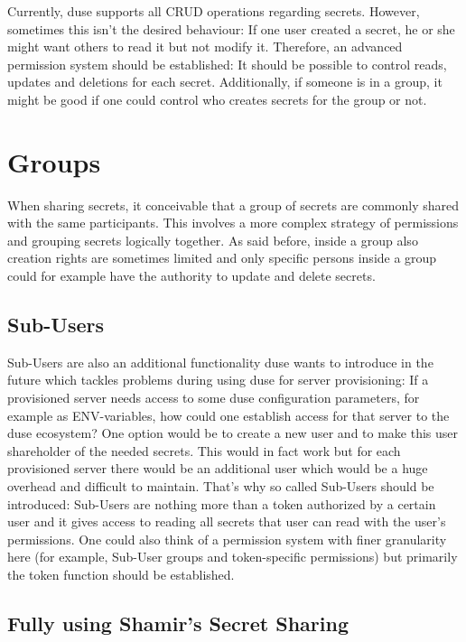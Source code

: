 Currently, duse supports all CRUD operations regarding secrets. However,
sometimes this isn't the desired behaviour: If one user created a secret,
he or she might want others to read it but not modify it. Therefore, an
advanced permission system should be established: It should be possible to
control reads, updates and deletions for each secret. Additionally, if
someone is in a group, it might be good if one could control who creates
secrets for the group or not.

\section{Groups}

When sharing secrets, it conceivable that a group of secrets are commonly
shared with the same participants. This involves a more complex strategy of
permissions and grouping secrets logically together. As said before,
inside a group also creation rights are sometimes limited and only specific
persons inside a group could for example have the authority to update and
delete secrets.

\subsection{Sub-Users}

Sub-Users are also an additional functionality duse wants to introduce in
the future which tackles problems during using duse for server provisioning:
If a provisioned server needs access to some duse configuration parameters,
for example as ENV-variables, how could one establish access for that server
to the duse ecosystem? One option would be to create a new user and to make
this user shareholder of the needed secrets. This would in fact work but for
each provisioned server there would be an additional user which would be a
huge overhead and difficult to maintain. That's why so called Sub-Users should
be introduced: Sub-Users are nothing more than a token authorized by a certain
user and it gives access to reading all secrets that user can read with the
user's permissions. One could also think of a permission system with finer
granularity here (for example, Sub-User groups and token-specific permissions)
but primarily the token function should be established.

\subsection{Fully using Shamir's Secret Sharing}

